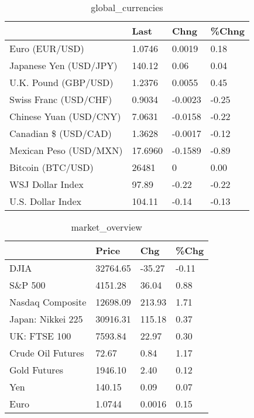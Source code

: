 \documentclass{article}%
\begin{document}
%


\begin{table}[htbp]%
\caption{global\_currencies}%
\centering%
\begin{adjustbox}{width=1\textwidth}%
\begin{tabular}{llll}
\toprule
                       &    Last &    Chng & \%Chng \\
\midrule
        Euro (EUR/USD) &  1.0746 &  0.0019 &  0.18 \\
Japanese Yen (USD/JPY) &  140.12 &    0.06 &  0.04 \\
  U.K. Pound (GBP/USD) &  1.2376 &  0.0055 &  0.45 \\
 Swiss Franc (USD/CHF) &  0.9034 & -0.0023 & -0.25 \\
Chinese Yuan (USD/CNY) &  7.0631 & -0.0158 & -0.22 \\
  Canadian \$ (USD/CAD) &  1.3628 & -0.0017 & -0.12 \\
Mexican Peso (USD/MXN) & 17.6960 & -0.1589 & -0.89 \\
     Bitcoin (BTC/USD) &   26481 &       0 &  0.00 \\
      WSJ Dollar Index &   97.89 &   -0.22 & -0.22 \\
     U.S. Dollar Index &  104.11 &   -0.14 & -0.13 \\
\bottomrule
\end{tabular}
%
\end{adjustbox}%
\end{table}

%


\begin{table}[htbp]%
\caption{market\_overview}%
\centering%
\begin{adjustbox}{width=1\textwidth}%
\begin{tabular}{llll}
\toprule
                  &    Price &    Chg &  \%Chg \\
\midrule
             DJIA & 32764.65 & -35.27 & -0.11 \\
          S\&P 500 &  4151.28 &  36.04 &  0.88 \\
 Nasdaq Composite & 12698.09 & 213.93 &  1.71 \\
Japan: Nikkei 225 & 30916.31 & 115.18 &  0.37 \\
     UK: FTSE 100 &  7593.84 &  22.97 &  0.30 \\
Crude Oil Futures &    72.67 &   0.84 &  1.17 \\
     Gold Futures &  1946.10 &   2.40 &  0.12 \\
              Yen &   140.15 &   0.09 &  0.07 \\
             Euro &   1.0744 & 0.0016 &  0.15 \\
\bottomrule
\end{tabular}
%
\end{adjustbox}%
\end{table}

%
\end{document}
